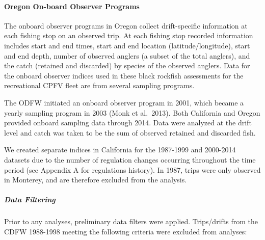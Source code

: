 \documentclass[11pt,
  english,
  letterpaper,
]{article}
\begin{document}
\hypertarget{oregon-on-board-observer-programs}{%
\paragraph{Oregon On-board Observer Programs}\label{oregon-on-board-observer-programs}}

The onboard observer programs in Oregon collect drift-specific information at each fishing stop on an observed trip. At each fishing stop recorded information includes start and end times, start and end location (latitude/longitude), start and end depth, number of observed anglers (a subset of the total anglers), and the catch (retained and discarded) by species of the observed anglers. Data for the onboard observer indices used in these black rockfish assessments for the recreational CPFV fleet are from several sampling programs.

The ODFW initiated an onboard observer program in 2001, which became a yearly sampling program in 2003 (Monk et al.~2013). Both California and Oregon provided onboard sampling data through 2014. Data were analyzed at the drift level and catch was taken to be the sum of observed retained and discarded fish.

We created separate indices in California for the 1987-1999 and 2000-2014 datasets due to the number of regulation changes occurring throughout the time period (see Appendix A for regulations history). In 1987, trips were only observed in Monterey, and are therefore excluded from the analysis.

\hypertarget{data-filtering}{%
\subparagraph{Data Filtering}\label{data-filtering}}

Prior to any analyses, preliminary data filters were applied. Trips/drifts from the CDFW 1988-1998 meeting the following criteria were excluded from analyses:
\end{document}
